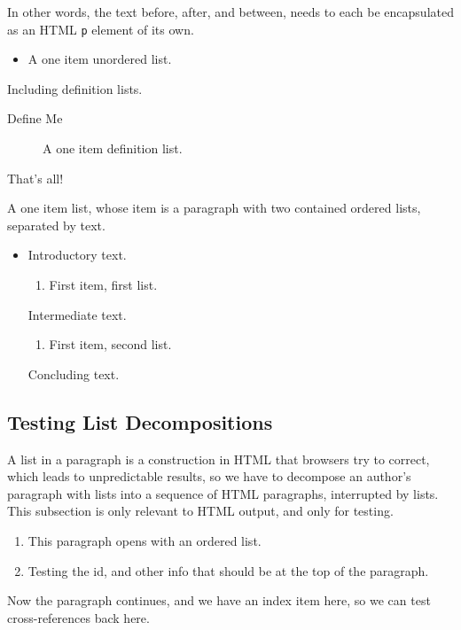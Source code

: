 \documentclass[10pt,]{article}
\theoremstyle{plain}
\theoremstyle{definition}
\theoremstyle{definition}
\theoremstyle{definition}
\theoremstyle{definition}
\theoremstyle{definition}
\theoremstyle{definition}
\numberwithin{equation}{section}
\begin{document}
In other words, the text before, after, and between, needs to each be encapsulated as an HTML \lstinline?p? element of its own.\leavevmode%
\begin{itemize}[label=\textbullet]
\item{}A one item unordered list.%
\end{itemize}
Including definition lists.\leavevmode%
\begin{description}
\item[{Define Me}]\hypertarget{li-151}{}\hypertarget{p-428}{}%
A one item definition list.%
\end{description}
That's all!%
\par
\hypertarget{p-429}{}%
A one item list, whose item is a paragraph with two contained ordered lists, separated by text.\leavevmode%
\begin{itemize}[label=$\blacksquare$]
\item{}\hypertarget{p-430}{}%
Introductory text.%
\begin{enumerate}[label=\Alph*]
\item\hypertarget{li-153}{}First item, first list.%
\end{enumerate}
Intermediate text.%
\begin{enumerate}[label=\alph*]
\item\hypertarget{li-154}{}First item, second list.%
\end{enumerate}
Concluding text.%
\end{itemize}
%
\typeout{************************************************}
\typeout{************************************************}
\subsection[{Testing List Decompositions}]{Testing List Decompositions}\label{subsection-33}
\hypertarget{p-431}{}%
A list in a paragraph is a construction in HTML that browsers try to correct, which leads to unpredictable results, so we have to decompose an author's paragraph with lists into a sequence of HTML paragraphs, interrupted by lists.  This subsection is only relevant to HTML output, and only for testing.%
\par
\hypertarget{p-432}{}%
\leavevmode%
\begin{enumerate}
\item\hypertarget{li-155}{}This paragraph opens with an ordered list.%
\item\hypertarget{li-156}{}Testing the id, and other info that should be at the top of the paragraph.%
\end{enumerate}
Now the paragraph continues, and we have an index item here, so we can test cross-references back here.%
\typeout{************************************************}
\typeout{************************************************}
\end{document}

